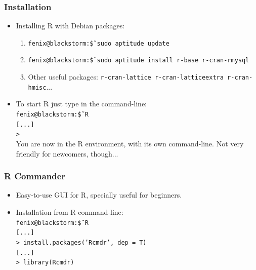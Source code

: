 \documentclass{beamer}
\begin{document}
\begin{frame}

\frametitle{Installation}
 \begin{itemize}
  \item Installing R with Debian packages:
  \begin{enumerate}
   \item \texttt{fenix@blackstorm:\~\$ sudo aptitude update}
   \item \texttt{fenix@blackstorm:\~\$ sudo aptitude install r-base r-cran-rmysql}
   \item Other useful packages: \texttt{r-cran-lattice r-cran-latticeextra r-cran-hmisc}...
  \end{enumerate}
   \item To start R just type in the command-line:\\
     \texttt{fenix@blackstorm:\~ \$ R}\\
     \texttt{[...]}\\
     \texttt{>}\\
    You are now in the R environment, with its own command-line. Not very
    friendly for newcomers, though...
 \end{itemize}

\end{frame}


\begin{frame}

\frametitle{R Commander}
  \begin{itemize}
   \item Easy-to-use GUI for R, specially useful for beginners.
   \item Installation from R command-line:\\
     \texttt{fenix@blackstorm:\~ \$ R}\\
     \texttt{[...]}\\
     \texttt{> install.packages('Rcmdr', dep = T)}\\
     \texttt{[...]}\\
     \texttt{> library(Rcmdr)}\\
  \end{itemize}

\end{frame}

\end{document}
